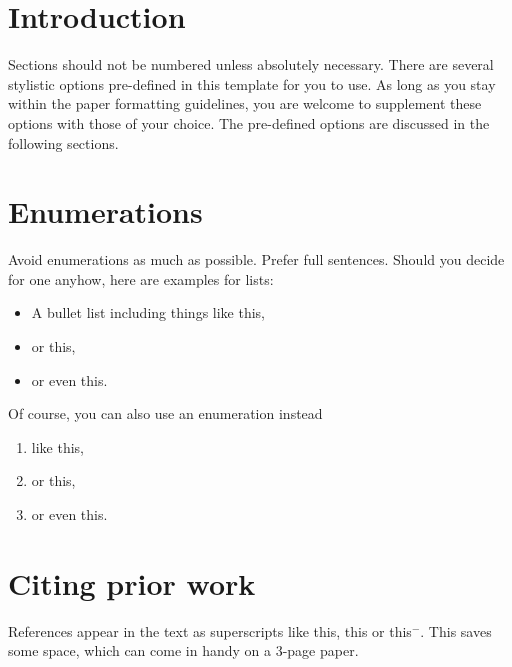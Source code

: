 \documentclass[a4paper, oneside, twocolumn, notitlepage, 10pt]{extarticle_ecoc}
\begin{document}

\section{Introduction}
Sections should not be numbered unless absolutely necessary. There are several stylistic options pre-defined in this template for you to use. As long as you stay within the paper formatting guidelines, you are welcome to supplement these options with those of your choice. The pre-defined options are discussed in the following sections.


\section{Enumerations}
Avoid enumerations as much as possible. Prefer full sentences. Should you decide for one anyhow, here are examples for lists:
\begin{itemize}
\item A bullet list including things like this,
\item or this,
\item or even this.
\end{itemize}
Of course, you can also use an enumeration instead
\begin{enumerate}
\item like this,
\item or this,
\item or even this.
\end{enumerate}


\section{Citing prior work}
References appear in the text as superscripts like this\cite{ref1}, this\cite{ref1,ref2} or this\cite{ref1}$^-$\cite{ref3}. This saves some space, which can come in handy on a 3-page paper.

\end{document}
